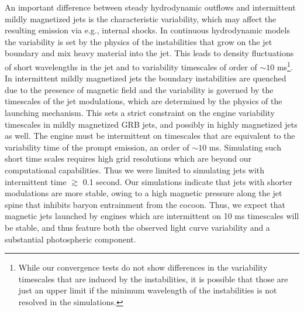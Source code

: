 \documentclass[fleqn,usenatbib]{mnras}
\begin{document}
	An important difference between steady hydrodynamic outflows and intermittent mildly magnetized jets is the characteristic variability, which may affect the resulting emission via e.g., internal shocks. In continuous hydrodynamic models the variability is set by the physics of the instabilities that grow on the jet boundary and mix heavy material into the jet. This leads to density fluctuations of short wavelengths in the jet and to variability timescales of order of $ \sim 10 $ ms\footnote{While our convergence tests do not show differences in the variability timescales that are induced by the instabilities, it is possible that those are just an upper limit if the minimum wavelength of the instabilities is not resolved in the simulations.}. 
	In intermittent mildly magnetized jets the boundary instabilities are quenched due to the presence of magnetic field and the variability is governed by the timescales of the jet modulations, which are determined by the physics of the launching mechanism.
	This sets a strict constraint on the engine variability timescales in mildly magnetized GRB jets, and possibly in highly magnetized jets as well. The engine must be intermittent on timescales that are equivalent to the variability time of the prompt emission, an order of $\sim 10 $ ms. 
	Simulating such short time scales requires high grid resolutions which are beyond our computational capabilities. Thus we were limited to simulating jets with intermittent time $ \gtrsim $ 0.1 second. Our simulations indicate that jets with shorter modulations are more stable, owing to a high magnetic pressure along the jet spine that inhibits baryon entrainment from the cocoon. Thus, we expect that magnetic jets launched by engines which are intermittent on 10 ms timescales will be stable, and thus feature both the observed light curve variability and a substantial photospheric component.
	
\end{document}
